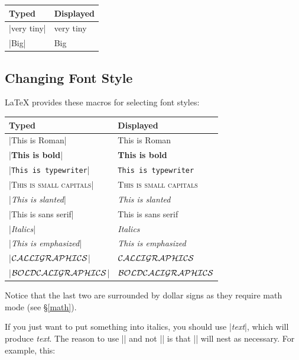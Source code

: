 \begin{center}
\begin{tabular}{l|l}
Typed & Displayed  \\\hline
|{\fontsize{4}{5}\selectfont very tiny}|& {\fontsize{4}{5}\selectfont very tiny}\\
|{\fontsize{64}{64}\selectfont Big}|& {\fontsize{64}{64}\selectfont Big}\\
\end{tabular}
\end{center}

\subsection{Changing Font Style}
\LaTeX{} provides these macros for selecting font styles:

\begin{center}
\begin{tabular}{l|l}
Typed                                  & Displayed\\\hline
|\textrm{This is Roman}|               & \textrm{This is Roman} \\
|\textbf{This is bold}|                & \textbf{This is bold}\\
|\texttt{This is typewriter}|          & \texttt{This is typewriter}\\
|\textsc{This is small capitals}|      & \textsc{This is small capitals}\\
|\textsl{This is slanted}|             & \textsl{This is slanted}\\
|\textsf{This is sans serif}|          & \textsf{This is sans serif}\\
|\textit{Italics}|                     & \textit{Italics}\\
|\emph{This is emphasized}|            & \emph{This is emphasized}\\
|$\cal CALLIGRAPHICS$|                 & $\cal CALLIGRAPHICS$\\
|{\boldmath $\cal BOLD CALIGRAPHICS$}| & {\boldmath $\cal BOLD CALIGRAPHICS$}\\
\end{tabular}
\end{center}

Notice that the last two are surrounded by dollar signs as they require math mode (see \S\ref{math}).

If you just want to put something into italics, you should use
|\emph{text}|, which will produce \emph{text}. The reason to use
|\emph{}| and not |\textit{}| is that |\emph{}| will nest as
necessary.  For example, this:

